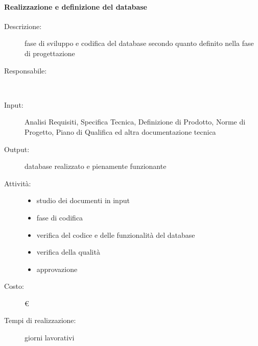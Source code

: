 \paragraph{Realizzazione e definizione del database}
\begin{description}
\item[Descrizione:] fase di sviluppo e codifica del database secondo quanto definito nella fase
di progettazione\\

\item[Responsabile:] \\

\item[Input:] Analisi Requisiti, Specifica Tecnica, Definizione di Prodotto, Norme di Progetto,
Piano di Qualifica ed altra documentazione tecnica\\

\item[Output:]database realizzato e pienamente funzionante
\item[Attività:]
\begin{itemize}
\item studio dei documenti in input
\item fase di codifica
\item verifica del codice e delle funzionalità del database
\item verifica della qualità
\item approvazione
\end{itemize}
\item[Costo:] \euro \\
\item[Tempi di realizzazione:]  giorni lavorativi
\end{description}




